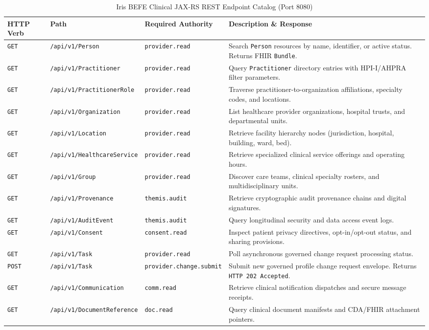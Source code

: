 \begin{table}[htbp]
\centering
\small
\begin{tabularx}{\textwidth}{l l p{3.5cm} X}
\toprule
\textbf{HTTP Verb} & \textbf{Path} & \textbf{Required Authority} & \textbf{Description \& Response} \\
\midrule
\texttt{GET} & \texttt{/api/v1/Person} & \texttt{provider.read} & Search \texttt{Person} resources by name, identifier, or active status. Returns FHIR \texttt{Bundle}. \\
\texttt{GET} & \texttt{/api/v1/Practitioner} & \texttt{provider.read} & Query \texttt{Practitioner} directory entries with HPI-I/AHPRA filter parameters. \\
\texttt{GET} & \texttt{/api/v1/PractitionerRole} & \texttt{provider.read} & Traverse practitioner-to-organization affiliations, specialty codes, and locations. \\
\texttt{GET} & \texttt{/api/v1/Organization} & \texttt{provider.read} & List healthcare provider organizations, hospital trusts, and departmental units. \\
\texttt{GET} & \texttt{/api/v1/Location} & \texttt{provider.read} & Retrieve facility hierarchy nodes (jurisdiction, hospital, building, ward, bed). \\
\texttt{GET} & \texttt{/api/v1/HealthcareService} & \texttt{provider.read} & Retrieve specialized clinical service offerings and operating hours. \\
\texttt{GET} & \texttt{/api/v1/Group} & \texttt{provider.read} & Discover care teams, clinical specialty rosters, and multidisciplinary units. \\
\texttt{GET} & \texttt{/api/v1/Provenance} & \texttt{themis.audit} & Retrieve cryptographic audit provenance chains and digital signatures. \\
\texttt{GET} & \texttt{/api/v1/AuditEvent} & \texttt{themis.audit} & Query longitudinal security and data access event logs. \\
\texttt{GET} & \texttt{/api/v1/Consent} & \texttt{consent.read} & Inspect patient privacy directives, opt-in/opt-out status, and sharing provisions. \\
\texttt{GET} & \texttt{/api/v1/Task} & \texttt{provider.read} & Poll asynchronous governed change request processing status. \\
\texttt{POST} & \texttt{/api/v1/Task} & \texttt{provider.change.submit} & Submit new governed profile change request envelope. Returns \texttt{HTTP 202 Accepted}. \\
\texttt{GET} & \texttt{/api/v1/Communication} & \texttt{comm.read} & Retrieve clinical notification dispatches and secure message receipts. \\
\texttt{GET} & \texttt{/api/v1/DocumentReference} & \texttt{doc.read} & Query clinical document manifests and CDA/FHIR attachment pointers. \\
\bottomrule
\end{tabularx}
\caption{Iris BEFE Clinical JAX-RS REST Endpoint Catalog (Port 8080)}
\label{tab:befe_clinical_endpoints}
\end{table}


